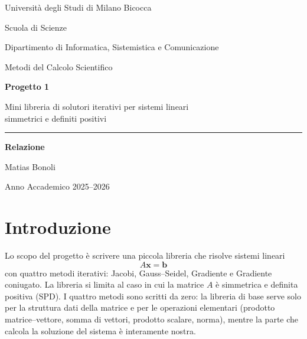 \documentclass[11pt,a4paper]{article}
\begin{document}
\begin{titlepage}
\centering
\vspace*{2cm}

{\large Università degli Studi di Milano Bicocca\par}
{\large Scuola di Scienze\par}
{\large Dipartimento di Informatica, Sistemistica e Comunicazione\par}
\vspace{0.8cm}
{\large Metodi del Calcolo Scientifico\par}

\vspace{2.2cm}
{\Huge\bfseries Progetto 1\par}
\vspace{0.6cm}
{\Large Mini libreria di solutori iterativi per sistemi lineari\\ simmetrici e definiti positivi\par}

\vspace{2.2cm}
\rule{0.55\textwidth}{0.4pt}\par
\vspace{0.6cm}
{\large\bfseries Relazione\par}
\vspace{0.6cm}

\vspace{1.6cm}
{\large Matias Bonoli\par}

\vfill
{\large Anno Accademico 2025--2026\par}
\end{titlepage}

\tableofcontents
\newpage

\section{Introduzione}
Lo scopo del progetto è scrivere una piccola libreria che risolve sistemi
lineari
\[
A\mathbf{x}=\mathbf{b}
\]
con quattro metodi iterativi: Jacobi, Gauss--Seidel, Gradiente e Gradiente
coniugato. La libreria si limita al caso in cui la matrice $A$ è simmetrica e
definita positiva (SPD). I quattro metodi sono scritti da zero: la libreria di
base serve solo per la struttura dati della matrice e per le operazioni
elementari (prodotto matrice--vettore, somma di vettori, prodotto scalare,
norma), mentre la parte che calcola la soluzione del sistema è interamente
nostra.
\end{document}
